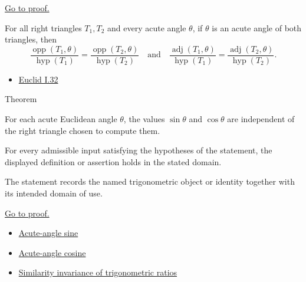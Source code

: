 \begin{remark*}[Proof]
\hyperref[prf:trig-ratios-similarity-invariant]{Go to proof.}
\end{remark*}
\begin{remark*}
For all right triangles $T_1,T_2$ and every acute angle $\theta$, if $\theta$
is an acute angle of both triangles, then
\[
\frac{\operatorname{opp}(T_1,\theta)}{\operatorname{hyp}(T_1)}
=
\frac{\operatorname{opp}(T_2,\theta)}{\operatorname{hyp}(T_2)}
\quad\text{and}\quad
\frac{\operatorname{adj}(T_1,\theta)}{\operatorname{hyp}(T_1)}
=
\frac{\operatorname{adj}(T_2,\theta)}{\operatorname{hyp}(T_2)}.
\]
\end{remark*}
\begin{dependencies}
\begin{itemize}
  \item \hyperref[thm:euclid-i-32]{Euclid I.32}
\end{itemize}
\end{dependencies}



\begin{theorembox}{Theorem}
\begin{theorem}
\label{thm:sine-cosine-well-defined}
For each acute Euclidean angle $\theta$, the values $\sin\theta$ and
\(\cos\theta\) are independent of the right triangle chosen to compute them.
\end{theorem}
\end{theorembox}
\begin{remark*}
For every admissible input satisfying the hypotheses of the statement, the
displayed definition or assertion holds in the stated domain.
\end{remark*}

\begin{remark*}[Interpretation]
The statement records the named trigonometric object or identity together with
its intended domain of use.
\end{remark*}

\begin{remark*}[Proof]
\hyperref[prf:sine-cosine-well-defined]{Go to proof.}
\end{remark*}
\begin{dependencies}
\begin{itemize}
  \item \hyperref[def:acute-angle-sine]{Acute-angle sine}
  \item \hyperref[def:acute-angle-cosine]{Acute-angle cosine}
  \item \hyperref[thm:trig-ratios-similarity-invariant]{Similarity invariance of trigonometric ratios}
\end{itemize}
\end{dependencies}

